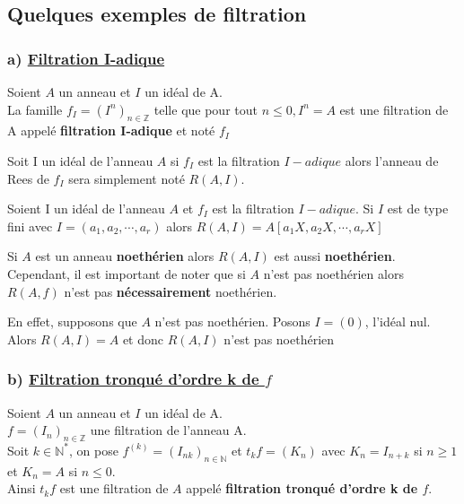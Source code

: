\subsection{Quelques exemples de filtration}
\subsubsection{a) \underline{Filtration I-adique}}
\begin{madefinition}
	Soient $A$ un anneau et $I$ un idéal de A.\\
	La famille $f_I = (I^n)_{n\in \mathbb{Z}}$ telle que pour tout $n \leqslant 0, I^n = A$ est une filtration de A appelé \textbf{filtration I-adique} et noté $f_I$
\end{madefinition}
Soit I un idéal de l'anneau $A$ si $f_I$ est la filtration $I-adique$ alors l'anneau de Rees de $f_I$ sera simplement noté $R(A,I)$.
\begin{maproposition}
	Soient I un idéal de l'anneau $A$ et $f_I$ est la filtration $I-adique$.
	Si $I$ est de type fini avec $I = (a_1, a_2, \cdots, a_r)$ alors $R(A,I) = A[a_1X,a_2X, \cdots, a_rX] $
\end{maproposition}
\begin{maconsequence}
	Si $A$ est un anneau \textbf{noethérien} alors $R(A,I)$ est aussi \textbf{noethérien}. \\
	Cependant, il est important de noter que si $A$ n'est pas noethérien alors $R(A,f)$ n'est pas \textbf{nécessairement} noethérien.
\end{maconsequence}
\begin{monexemple}
	En effet, supposons que $A$ n'est pas noethérien.
	Posons $I = (0)$, l'idéal nul. Alors $R(A,I) = A$ et donc $R(A,I)$ n'est pas noethérien
\end{monexemple}


\subsubsection{b) \underline{Filtration tronqué d'ordre k de $f$}}
\begin{madefinition}
	Soient $A$ un anneau et $I$ un idéal de A.\\
	$f = (I_n)_{n\in \mathbb{Z}}$ une filtration de l'anneau A.\\
	Soit $k \in \mathbb{N}^{*}$, on pose $f^{(k)} = (I_{nk})_{n\in \mathbb{N}}$ et $t_{k}f=(K_n)$ avec $K_n = I_{n+k}$ si $n \geqslant 1 $ et $K_n = A$ si $n \leqslant 0$.\\
	Ainsi $t_{k}f$ est une filtration de $A$ appelé \textbf{filtration tronqué d'ordre k de $f$}.
\end{madefinition}

